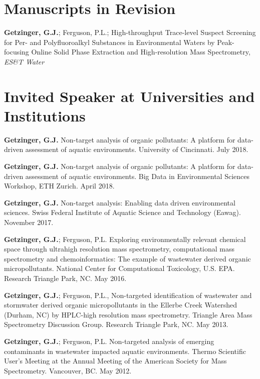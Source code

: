 \documentclass[letterpaper,10pt]{article}
\begin{document}
\section{Manuscripts in Revision}
\begin{etaremune}
\item {\bfseries Getzinger, G.J.}; Ferguson, P.L.;  High-throughput Trace-level Suspect Screening for Per- and Polyfluoroalkyl Substances in Environmental Waters by Peak-focusing Online Solid Phase Extraction and High-resolution Mass Spectrometry, \emph{ES\&T Water} 
\end{etaremune}
%
%
\section{Invited Speaker at Universities and Institutions} 
\begin{etaremune}
\item{{\bfseries Getzinger, G.J.}} Non-target analysis of organic pollutants: A platform for data-driven assessment of aquatic environments. University of Cincinnati. July 2018.
\item{{\bfseries Getzinger, G.J.}} Non-target analysis of organic pollutants: A platform for data-driven assessment of aquatic environments. Big Data in Environmental Sciences Workshop, ETH Zurich. April 2018.
\item{{\bfseries Getzinger, G.J.}} Non-target analysis: Enabling data driven environmental sciences. Swiss Federal Institute of Aquatic Science and Technology (Eawag). November 2017.
\item{{\bfseries Getzinger, G.J.}}; Ferguson, P.L. Exploring environmentally relevant chemical space through ultrahigh resolution mass spectrometry, computational mass spectrometry and chemoinformatics: The example of wastewater derived organic micropollutants. National Center for Computational Toxicology, U.S.  EPA. Research Triangle Park, NC. May 2016.
% 
\item {\bfseries Getzinger, G.J.}; Ferguson, P.L., Non-targeted identification of wastewater and stormwater derived organic micropollutants in the Ellerbe Creek Watershed (Durham, NC) by HPLC-high resolution mass spectrometry. Triangle Area Mass Spectrometry Discussion Group. Research Triangle Park, NC. May 2013. 
%
\item {\bfseries Getzinger, G.J.}; Ferguson, P.L. Non-targeted analysis of emerging contaminants in wastewater impacted aquatic environments. Thermo Scientific User's Meeting at the Annual Meeting of the American Society for Mass Spectrometry. Vancouver, BC. May 2012.
\end{etaremune}
%
\end{document}
